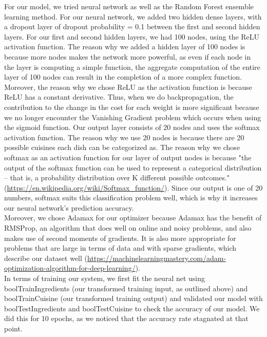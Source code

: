 \documentclass[11pt]{article}
\begin{document}
For our model, we tried neural network as well as the Random Forest ensemble learning
method. For our neural network, we added two hidden dense layers, with a
dropout layer of dropout probability = 0.1 between the first and second hidden
layers. For our first and second hidden layers, we had 100 nodes, using the ReLU
activation function. The reason why we added a hidden layer of 100 nodes
is because more nodes makes the network more powerful, as even if
each node in the layer is computing a simple function, the aggregate computation
of the entire layer of 100 nodes can result in the completion of a more
complex function. Moreover, the reason why we chose ReLU as the activation function is because
ReLU has a constant derivative. Thus, when we do backpropagation, the contribution
to the change in the cost for each weight is more significant because
we no longer encounter the Vanishing Gradient problem which occurs when using the
sigmoid function. Our output layer consists of 20 nodes and uses the softmax
activation function. The reason why we use 20 nodes is because there are 20
possible cuisines each dish can be categorized as. The reason why we chose softmax as an activation function for our layer of
output nodes is because "the output of the softmax function can be used to
represent a categorical distribution – that is, a probability distribution
over K different possible outcomes." (\url{https://en.wikipedia.org/wiki/Softmax_function/}).
Since our output is one of 20 numbers, softmax suits this classification problem
well, which is why it increases our neural network's prediction accuracy. \\

Moreover, we chose Adamax for our optimizer because Adamax has the benefit of RMSProp,
an algorithm that does well on online and noisy problems, and also makes
use of second moments of gradients. It is also more appropriate for problems
that are large in terms of data and with sparse gradients, which describe our
dataset well (\url{https://machinelearningmastery.com/adam-optimization-algorithm-for-deep-learning/}). \\



In terms of training our system, we first fit the neural net using boolTrainIngredients
(our transformed training input, as outlined above) and boolTrainCuisine (our
transformed training output) and validated our model with boolTestIngredients and boolTestCuisine
to check the accuracy of our model. We did this for 10 epochs, as we noticed that
the accuracy rate stagnated at that point. \\
\end{document}
